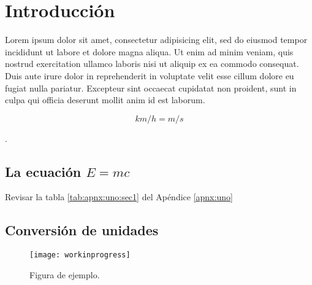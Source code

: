 \chapter{Introducción}
Lorem ipsum dolor sit amet, consectetur adipisicing elit, sed do eiusmod tempor incididunt ut labore et dolore magna aliqua. Ut enim ad minim veniam, quis nostrud exercitation ullamco laboris nisi ut aliquip ex ea commodo consequat. Duis aute irure dolor in reprehenderit in voluptate velit esse cillum dolore eu fugiat nulla pariatur. Excepteur sint occaecat cupidatat non proident, sunt in culpa qui officia deserunt mollit anim id est laborum\citep{ejemplo01}.


\begin{equation*}
  \si{km\per h = m\per s}
\end{equation*}

\lipsum[2]\cite{ejemplo02}.

\section{La ecuación \texorpdfstring{$E=mc$}{E=mc}}
\lipsum[3]\citep{Dan,Baz}

\lipsum[4] Revisar la tabla \ref{tab:apnx:uno:sec1} del Apéndice \ref{apnx:uno}

\section{Conversión de unidades}%
\lipsum[7]

\begin{figure}[!h]
  \center
  \texttt{[image: workinprogress]}
  \caption{Figura de ejemplo.}
  \label{fig:ejemplo1}
\end{figure}

\lipsum[8-9]


